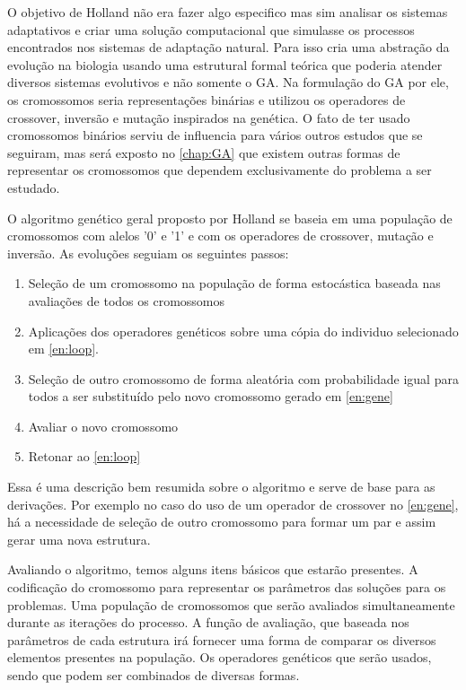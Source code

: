 O objetivo de Holland não era fazer algo especifico mas sim analisar os sistemas adaptativos e criar uma solução computacional que simulasse os processos encontrados nos sistemas de adaptação natural. Para isso cria uma abstração da evolução na biologia usando uma estrutural formal teórica que poderia atender diversos sistemas evolutivos e não somente o GA. Na formulação do GA por ele, os cromossomos seria representações binárias e utilizou os operadores de crossover, inversão e mutação inspirados na genética. O fato de ter usado cromossomos binários serviu de influencia para vários outros estudos que se seguiram, mas será exposto no \autoref{chap:GA} que existem outras formas de representar os cromossomos que dependem exclusivamente do problema a ser estudado.

O algoritmo genético geral proposto por Holland se baseia em uma população de cromossomos com alelos '0' e '1' e com os operadores de crossover, mutação e inversão. As evoluções seguiam os seguintes passos: 
\begin{enumerate}
	\item \label{en:loop} Seleção de um cromossomo na população de forma estocástica baseada nas avaliações de todos os cromossomos
	\item \label{en:gene} Aplicações dos operadores genéticos sobre uma cópia do individuo selecionado em \ref{en:loop}.
	\item Seleção de outro cromossomo de forma aleatória com probabilidade igual para todos a ser substituído pelo novo cromossomo gerado em \ref{en:gene}
	\item Avaliar o novo cromossomo
	\item Retonar ao \ref{en:loop}
\end{enumerate}

Essa é uma descrição bem resumida sobre o algoritmo e serve de base para as derivações. Por exemplo no caso do uso de um operador de crossover no \autoref{en:gene}, há a necessidade de seleção de outro cromossomo para formar um par e assim gerar uma nova estrutura.

Avaliando o algoritmo, temos alguns itens básicos que estarão presentes. A codificação do cromossomo para representar os parâmetros das soluções para os problemas. Uma população de cromossomos que serão avaliados simultaneamente durante as iterações do processo. A função de avaliação, que baseada nos parâmetros de cada estrutura irá fornecer uma forma de comparar os diversos elementos presentes na população. Os operadores genéticos que serão usados, sendo que podem ser combinados de diversas formas. 

